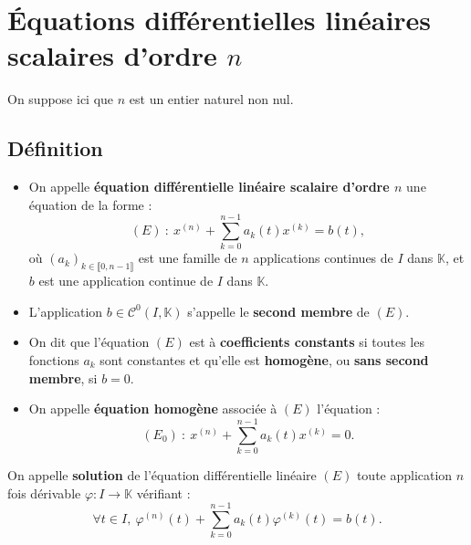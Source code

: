\documentclass[french]{article}
\newcommand{\K}{\mathbb{K}}
\theoremstyle{plain}
\theoremstyle{definition}
\theoremstyle{remark}
\begin{document}
\section{Équations différentielles linéaires scalaires d'ordre $n$}

On suppose ici que $n$ est un entier naturel non nul.

\subsection{Définition}

\begin{dfn}
	\begin{itemize}
		\item On appelle \textbf{équation différentielle linéaire scalaire d'ordre $n$} une équation de la forme :
		$$(E)\ :\ x^{(n)}+\sum_{k=0}^{n-1}a_k(t)x^{(k)}=b(t),$$ où $(a_k)_{k\in\llbracket0,n-1\rrbracket}$ est une famille de $n$ applications continues de $I$ dans $\K$, et $b$ est une application continue de $I$ dans $\K$.
		\item L'application $b\in\mathcal{C}^0(I,\K)$ s'appelle le \textbf{second membre} de $(E)$.
		\item On dit que l'équation $(E)$ est à \textbf{coefficients constants} si toutes les fonctions $a_k$ sont constantes et qu'elle est \textbf{homogène}, ou \textbf{sans second membre}, si $b=0$.
		\item On appelle \textbf{équation homogène} associée à $(E)$ l'équation :
		$$(E_0)\ :\ x^{(n)}+\sum_{k=0}^{n-1}a_k(t)x^{(k)}=0.$$
	\end{itemize}
\end{dfn}

\begin{dfn}
	On appelle \textbf{solution} de l'équation différentielle linéaire $(E)$ toute application $n$ fois dérivable $\varphi:I\to\K$ vérifiant :
	$$\forall t\in I,\ \varphi^{(n)}(t)+\sum_{k=0}^{n-1}a_k(t)\varphi^{(k)}(t)=b(t).$$
\end{dfn}
\end{document}
